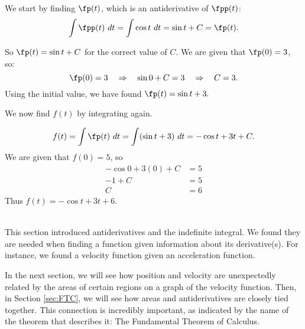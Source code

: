 {We start by finding $\fp(t)$, which is an antiderivative of $\fpp(t)$:
		$$\int \fpp(t)\ dt = \int \cos t\ dt = \sin t + C = \fp(t).$$
		
		So $\fp(t) = \sin t+C$ for the correct value of $C$. We are given that $\fp(0) = 3$, so:
		$$\fp(0) = 3 \quad \Rightarrow \quad \sin 0+C = 3 \quad \Rightarrow \quad C=3.$$
		Using the initial value, we have found $\fp(t) = \sin t+ 3.$
		
We now find $f(t)$ by integrating again.

$$f(t)=\int \fp(t) \ dt = \int (\sin t+3)\ dt = -\cos t + 3t + C.$$ 
We are given that $f(0) = 5$, so
\begin{align*}
-\cos 0 + 3(0) + C &= 5 \\
-1 + C &= 5\\
C &= 6
\end{align*}
 Thus $f(t) = -\cos t + 3t + 6$.
}\\

This section introduced antiderivatives and the indefinite integral. We found they are needed when finding a function given information about its derivative(s). For instance, we found a velocity function given an acceleration function.

In the next section, we will see how position and velocity are unexpectedly related by the areas of certain regions on a graph of the velocity function. Then, in Section \ref{sec:FTC}, we will see how areas and antiderivatives are closely tied together. This connection is incredibly important, as indicated by the name of the theorem that describes it: The Fundamental Theorem of Calculus.

